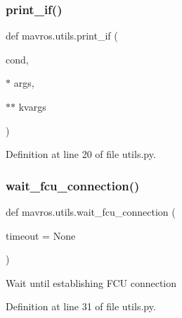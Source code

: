 \subsubsection{\texorpdfstring{print\_if()}{print\_if()}}
{\footnotesize\ttfamily def mavros.\+utils.\+print\+\_\+if (\begin{DoxyParamCaption}\item[{}]{cond,  }\item[{$\ast$}]{args,  }\item[{$\ast$$\ast$}]{kvargs }\end{DoxyParamCaption})}



Definition at line 20 of file utils.\+py.

\mbox{\label{namespacemavros_1_1utils_a2131b38b8f613788e1186891c5d05c9c}} 
\subsubsection{\texorpdfstring{wait\_fcu\_connection()}{wait\_fcu\_connection()}}
{\footnotesize\ttfamily def mavros.\+utils.\+wait\+\_\+fcu\+\_\+connection (\begin{DoxyParamCaption}\item[{}]{timeout = {\ttfamily None} }\end{DoxyParamCaption})}

\begin{DoxyVerb}Wait until establishing FCU connection
\end{DoxyVerb}
 

Definition at line 31 of file utils.\+py.

